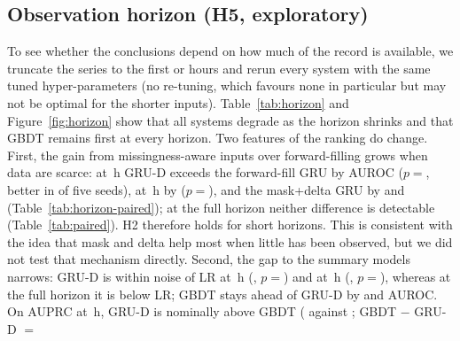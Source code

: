 \begin{table}[t]\centering\caption{Ablations (5 seeds each): AUROC/AUPRC/Brier as mean $\pm$ sd; $\Delta$AUROC and paired $p$ are against the full system of the same block; wins = seeds in which the ablated variant has higher AUROC.}\label{tab:abl}
\end{table}

\subsection{Observation horizon (H5, exploratory)}
To see whether the conclusions depend on how much of the record is available, we truncate the series to the first  or  hours and rerun every system with the same tuned hyper-parameters (no re-tuning, which favours none in particular but may not be optimal for the shorter inputs). Table~\ref{tab:horizon} and Figure~\ref{fig:horizon} show that all systems degrade as the horizon shrinks and that GBDT remains first at every horizon. Two features of the ranking do change. First, the gain from missingness-aware inputs over forward-filling grows when data are scarce: at \,h GRU-D exceeds the forward-fill GRU by  AUROC ($p=$, better in  of five seeds), at \,h by  ($p=$), and the mask+delta GRU by  and  (Table~\ref{tab:horizon-paired}); at the full horizon neither difference is detectable (Table~\ref{tab:paired}). H2 therefore holds for short horizons. This is consistent with the idea that mask and delta help most when little has been observed, but we did not test that mechanism directly. Second, the gap to the summary models narrows: GRU-D is within noise of LR at \,h (, $p=$) and at \,h (, $p=$), whereas at the full horizon it is below LR; GBDT stays ahead of GRU-D by  and  AUROC. On AUPRC at \,h, GRU-D is nominally above GBDT ( against ; GBDT $-$ GRU-D $=$ 